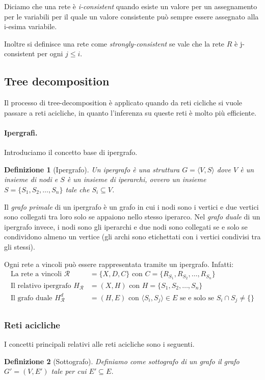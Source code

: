 \documentclass[a4paper, 11pt]{article}
\newtheorem{definit}{Definizione}[subsection]
\begin{document}
Diciamo che una rete è \textit{i-consistent} quando esiste un valore per un assegnamento per le variabili per il quale un valore consistente può sempre essere assegnato alla i-esima variabile.

Inoltre si definisce una rete come \textit{strongly-consistent} se vale che la rete $R$ è j-consistent per ogni $j \leq i$.

\subsection{Tree decomposition}
Il processo di tree-decomposition è applicato quando da reti cicliche si vuole passare a reti acicliche, in quanto l'inferenza su queste reti è molto più efficiente. 

\paragraph{Ipergrafi.}Introduciamo il concetto base di ipergrafo.
\begin{definit}[Ipergrafo]
	Un ipergrafo è una struttura $G= \langle V, S \rangle$ dove $V$ è un insieme di nodi e $S$ è un insieme di iperarchi, ovvero un insieme $S = \lbrace S_1, S_2, \dots, S_n \rbrace$ tale che $S_i \subseteq V$.
\end{definit}

Il \textit{grafo primale} di un ipergrafo è un grafo in cui i nodi sono i vertici e due vertici sono collegati tra loro solo se appaiono nello stesso iperarco.  Nel \textit{grafo duale} di un ipergrafo invece, i nodi sono gli iperarchi e due nodi sono collegati se e solo se condividono almeno un vertice (gli archi sono etichettati con i vertici condivisi tra gli stessi).

Ogni rete a vincoli può essere rappresentata tramite un ipergrafo. Infatti:
\begin{align*}
	\text{La rete a vincoli }\mathcal{R} &= \lbrace X, D, C \rbrace \text{ con } C= \lbrace R_{S_1}, R_{S_2}, \dots, R_{S_n} \rbrace \\
	\text{Il relativo ipergrafo } H_\mathcal{R} &= (X,H)  \text{ con } H = \lbrace S_1, S_2, \dots, S_n \rbrace \\
	\text{Il grafo duale } H_\mathcal{R}^d &= (H, E) \text{ con } \langle S_i, S_j \rangle \in E \text{ se e solo se } S_i \cap S_j \neq \lbrace \rbrace\\
\end{align*}

\subsubsection{Reti acicliche} 
I concetti principali relativi alle reti acicliche sono i seguenti.
\begin{definit}[Sottografo]
	Definiamo come sottografo di un grafo il grafo $G' = (V, E')$ tale per cui $E' \subseteq E$.
\end{definit}
\end{document}
